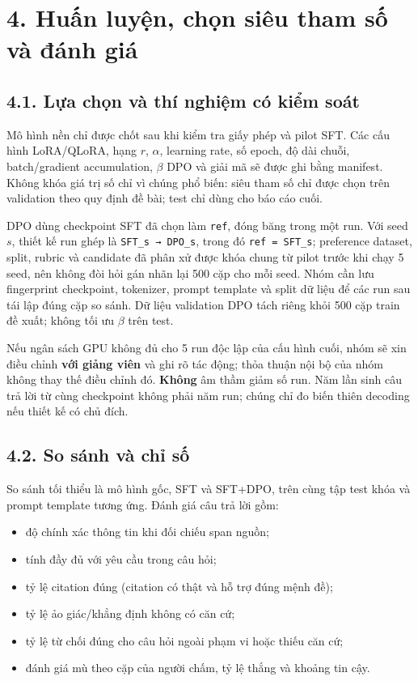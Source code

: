 \documentclass[11pt,a4paper]{article}
\providecommand{\tightlist}{\setlength{\itemsep}{0pt}\setlength{\parskip}{0pt}}
\begin{document}
\section{4. Huấn luyện, chọn siêu tham số và đánh
giá}\label{huux1ea5n-luyux1ec7n-chux1ecdn-siuxeau-tham-sux1ed1-vuxe0-ux111uxe1nh-giuxe1}

\subsection{4.1. Lựa chọn và thí nghiệm có kiểm
soát}\label{lux1ef1a-chux1ecdn-vuxe0-thuxed-nghiux1ec7m-cuxf3-kiux1ec3m-souxe1t}

Mô hình nền chỉ được chốt sau khi kiểm tra giấy phép và pilot SFT. Các
cấu hình LoRA/QLoRA, hạng \(r\), \(\alpha\), learning rate, số epoch, độ
dài chuỗi, batch/gradient accumulation, \(\beta\) DPO và giải mã sẽ được
ghi bằng manifest. Không khóa giá trị số chỉ vì chúng phổ biến: siêu
tham số chỉ được chọn trên validation theo quy định đề bài; test chỉ
dùng cho báo cáo cuối.

DPO dùng checkpoint SFT đã chọn làm \nolinkurl{ref}, đóng băng trong một
run. Với seed \(s\), thiết kế run ghép là \nolinkurl{SFT_s → DPO_s},
trong đó \nolinkurl{ref = SFT_s}; preference dataset, split, rubric và
candidate đã phân xử được khóa chung từ pilot trước khi chạy 5 seed, nên
không đòi hỏi gán nhãn lại 500 cặp cho mỗi seed. Nhóm cần lưu
fingerprint checkpoint, tokenizer, prompt template và split dữ liệu để
các run sau tái lập đúng cặp so sánh. Dữ liệu validation DPO tách riêng
khỏi 500 cặp train đề xuất; không tối ưu \(\beta\) trên test.

Nếu ngân sách GPU không đủ cho 5 run độc lập của cấu hình cuối, nhóm sẽ
xin điều chỉnh \textbf{với giảng viên} và ghi rõ tác động; thỏa thuận
nội bộ của nhóm không thay thế điều chỉnh đó. \textbf{Không} âm thầm
giảm số run. Năm lần sinh câu trả lời từ cùng checkpoint không phải năm
run; chúng chỉ đo biến thiên decoding nếu thiết kế có chủ đích.

\subsection{4.2. So sánh và chỉ
số}\label{so-suxe1nh-vuxe0-chux1ec9-sux1ed1}

So sánh tối thiểu là mô hình gốc, SFT và SFT+DPO, trên cùng tập test
khóa và prompt template tương ứng. Đánh giá câu trả lời gồm:

\begin{itemize}
\tightlist
\item
  độ chính xác thông tin khi đối chiếu span nguồn;
\item
  tính đầy đủ với yêu cầu trong câu hỏi;
\item
  tỷ lệ citation đúng (citation có thật và hỗ trợ đúng mệnh đề);
\item
  tỷ lệ ảo giác/khẳng định không có căn cứ;
\item
  tỷ lệ từ chối đúng cho câu hỏi ngoài phạm vi hoặc thiếu căn cứ;
\item
  đánh giá mù theo cặp của người chấm, tỷ lệ thắng và khoảng tin cậy.
\end{itemize}
\end{document}
